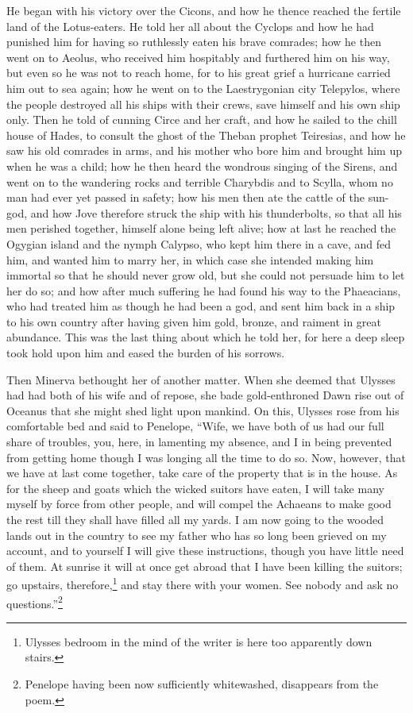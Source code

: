 He began with his victory over the Cicons, and how he thence reached the
fertile land of the Lotus-eaters. He told her all about the Cyclops and how he
had punished him for having so ruthlessly eaten his brave comrades; how he then
went on to Aeolus, who received him hospitably and furthered him on his way,
but even so he was not to reach home, for to his great grief a hurricane
carried him out to sea again; how he went on to the Laestrygonian city
Telepylos, where the people destroyed all his ships with their crews, save
himself and his own ship only. Then he told of cunning Circe and her craft, and
how he sailed to the chill house of Hades, to consult the ghost of the Theban
prophet Teiresias, and how he saw his old comrades in arms, and his mother who
bore him and brought him up when he was a child; how he then heard the wondrous
singing of the Sirens, and went on to the wandering rocks and terrible
Charybdis and to Scylla, whom no man had ever yet passed in safety; how his men
then ate the cattle of the sun-god, and how Jove therefore struck the ship with
his thunderbolts, so that all his men perished together, himself alone being
left alive; how at last he reached the Ogygian island and the nymph Calypso,
who kept him there in a cave, and fed him, and wanted him to marry her, in
which case she intended making him immortal so that he should never grow old,
but she could not persuade him to let her do so; and how after much suffering
he had found his way to the Phaeacians, who had treated him as though he had
been a god, and sent him back in a ship to his own country after having given
him gold, bronze, and raiment in great abundance. This was the last thing about
which he told her, for here a deep sleep took hold upon him and eased the
burden of his sorrows.

Then Minerva bethought her of another matter. When she deemed that Ulysses had
had both of his wife and of repose, she bade gold-enthroned Dawn rise out of
Oceanus that she might shed light upon mankind. On this, Ulysses rose from his
comfortable bed and said to Penelope, “Wife, we have both of us had our full
share of troubles, you, here, in lamenting my absence, and I in being prevented
from getting home though I was longing all the time to do so. Now, however,
that we have at last come together, take care of the property that is in the
house. As for the sheep and goats which the wicked suitors have eaten, I will
take many myself by force from other people, and will compel the Achaeans to
make good the rest till they shall have filled all my yards. I am now going to
the wooded lands out in the country to see my father who has so long been
grieved on my account, and to yourself I will give these instructions, though
you have little need of them. At sunrise it will at once get abroad that I have
been killing the suitors; go upstairs, therefore,\footnote{Ulysses bedroom in the mind of the writer is here too apparently down
stairs.} and stay there with your women. See
nobody and ask no questions.”\footnote{Penelope having been now sufficiently whitewashed, disappears from the
poem.}

